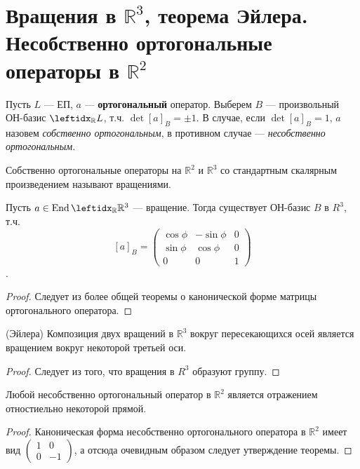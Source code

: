 \section{Вращения в $\mathbb{R}^3$, теорема Эйлера. Несобственно ортогональные операторы в $\mathbb{R}^2$}

\begin{defn}
    Пусть $L$ --- ЕП, $a$ --- \textbf{ортогональный} оператор. Выберем $B$ --- произвольный ОН-базис $\lsub{\mathbb{R}}{L}$, т.ч. $\det [a]_B = \pm 1$. В случае, если $\det [a]_B = 1$, $a$ назовем \textit{собственно ортогональным}, в противном случае --- \textit{несобственно ортогональным}.
\end{defn}

\begin{defn}
    Собственно ортогональные операторы на $\mathbb{R}^2$ и $\mathbb{R}^3$ со стандартным скалярным произведением называют вращениями.
\end{defn}

\begin{thm}
    Пусть $a \in \End \lsub{\mathbb{R}}{\mathbb{R}^3}$ --- вращение. Тогда существует ОН-базис $B$ в $R^3$, т.ч. $$[a]_B = \begin{pmatrix}
        \cos \phi & -\sin \phi & 0 \\
        \sin \phi & \cos \phi  & 0 \\
        0         & 0          & 1
    \end{pmatrix}$$.
\end{thm}

\begin{proof}
    Следует из более общей теоремы о канонической форме матрицы ортогонального оператора.
\end{proof}

\begin{thm}{(Эйлера)}
    Композиция двух вращений в $\mathbb{R}^3$ вокруг пересекающихся осей является вращением вокруг некоторой третьей оси.
\end{thm}

\begin{proof}
    Следует из того, что вращения в $R^3$ образуют группу.
\end{proof}

\begin{thm}
    Любой несобственно ортогональный оператор в $\mathbb{R}^2$ является отражением отностиельно некоторой прямой.
\end{thm}

\begin{proof}
    Каноническая форма несобственно ортогонального оператора в $\mathbb{R}^2$ имеет вид $\begin{pmatrix}
        1 & 0 \\
        0 & -1
    \end{pmatrix}$, а отсюда очевидным образом следует утверждение теоремы.
\end{proof}